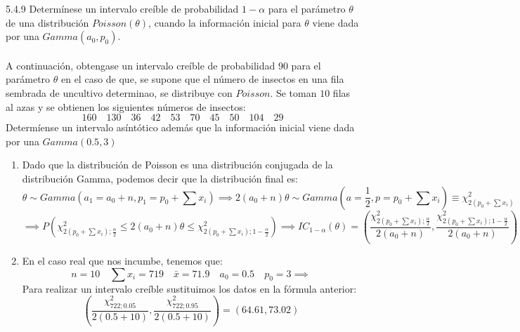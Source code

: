 \begin{problem}{5.4.9}
    Determínese un intervalo creíble de probabilidad $1- \alpha$ para el parámetro $\theta$ de una distribución $Poisson(\theta)$, cuando la información inicial para $\theta$ viene dada por una $Gamma(a_0, p_0)$. \\ \\
    A continuación, obtengase un intervalo creíble de probabilidad $90$ para el parámetro $\theta$ en el caso de que, se supone que el número de insectos en una fila sembrada de uncultivo determinao, se distribuye con $Poisson$. Se toman $10$ filas al azas y se obtienen los siguientes números de insectos: 
    $$160 \quad 130 \quad 36 \quad 42 \quad 53 \quad 70 \quad 45 \quad 50 \quad 104 \quad 29$$
    Determíense un intervalo asíntótico  además que la información inicial viene dada por una $Gamma(0.5, 3)$
\end{problem}
\begin{sol}
    \begin{enumerate}
        \item Dado que la distribución de Poisson es una distribución conjugada de la distribución Gamma, podemos decir que la distribución final es:
        $$\theta \sim Gamma(a_1 = a_0 + n, p_1 = p_0 + \sum x_i) \implies 2(a_0 + n)\theta \sim Gamma(a = \frac{1}{2}, p = p_0 + \sum x_i) \equiv \chi^2_{2(p_0 + \sum x_i)}$$
        $$ \implies P\left(\chi^2_{2(p_0 + \sum x_i); \frac{\alpha}{2}} \leq 2(a_0 + n)\theta \leq \chi^2_{2(p_0 + \sum x_i); 1- \frac{\alpha}{2}} \right) \implies IC_{1 - \alpha}(\theta) = \left(\frac{\chi^2_{2(p_0 + \sum x_i); \frac{\alpha}{2}}}{2(a_0 + n)},\frac{\chi^2_{2(p_0 + \sum x_i); 1-\frac{\alpha}{2}}}{2(a_0 + n)}\right)$$
        \item En el caso real que nos incumbe, tenemos que: 
        $$ n = 10 \quad \sum x_i = 719 \quad \bar{x} = 71.9 \quad a_0 = 0.5 \quad p_0 = 3 \implies$$
        Para realizar un intervalo creíble sustituimos los datos en la fórmula anterior: 
        $$\left(\frac{\chi_{722; 0.05}^2}{2(0.5 + 10)}, \frac{\chi_{722; 0.95}^2}{2(0.5 + 10)}\right) = (64.61, 73.02)$$
    \end{enumerate}
\end{sol}

